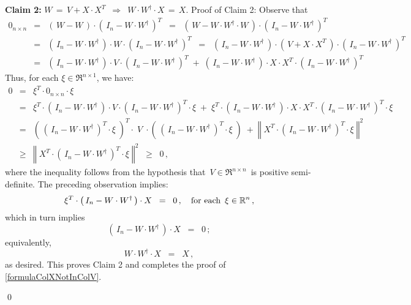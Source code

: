 \begin{enumerate}
	\vskip 0.5cm
	\noindent
	\textbf{Claim 2:}\quad
	$W \,=\, V + X \cdot X^{T}$
	\,\;$\Longrightarrow$\,\; $W \cdot W^{\dagger} \cdot X \,=\,X$.
	\vskip 0.0cm
	\noindent
	Proof of Claim 2:\quad
	Observe that
	\begin{eqnarray*}
	0_{n \times n}
	& = &
		\left(\,W - W\,\right) \cdot \left(\,I_{n} - W \cdot W^{\dagger}\,\right)^{T}
	\;\; = \;\;
		\left(\,W - W \cdot W^{\dagger} \cdot W\,\right) \cdot \left(\,I_{n} - W \cdot W^{\dagger}\,\right)^{T}
	\\
	& = &
		\left(\,I_{n} - W \cdot W^{\dagger} \,\right) \cdot W \cdot \left(\,I_{n} - W \cdot W^{\dagger}\,\right)^{T}
	\;\; = \;\;
		\left(\,I_{n} - W \cdot W^{\dagger} \,\right)
		\cdot \left(\,V + X \cdot X^{T}\,\right)
		\cdot \left(\,I_{n} - W \cdot W^{\dagger}\,\right)^{T}
	\\
	& = &
		\left(\,I_{n} - W \cdot W^{\dagger} \,\right)
		\cdot V \cdot \left(\,I_{n} - W \cdot W^{\dagger}\,\right)^{T}
		\; + \;
		\left(\,I_{n} - W \cdot W^{\dagger} \,\right)
		\cdot X \cdot X^{T} \cdot \left(\,I_{n} - W \cdot W^{\dagger}\,\right)^{T}
	\end{eqnarray*}
	Thus, for each $\xi \in \Re^{n \times 1}$, we have:
	\begin{eqnarray*}
	0
	&=&
		\xi^{T} \cdot 0_{n \times n} \cdot \xi
	\\
	& = &
		\xi^{T}
		\cdot
		\left(\,I_{n} - W \cdot W^{\dagger} \,\right) \cdot V \cdot \left(\,I_{n} - W \cdot W^{\dagger}\,\right)^{T}
		\cdot \xi
		\; + \;
		\xi^{T}
		\cdot
		\left(\,I_{n} - W \cdot W^{\dagger} \,\right) \cdot X \cdot X^{T} \cdot \left(\,I_{n} - W \cdot W^{\dagger}\,\right)^{T}
		\cdot \xi		
	\\
	& = &
		\left(\,\left(\,I_{n} - W \cdot W^{\dagger}\,\right)^{T} \cdot \xi\;\right)^{T}
		\cdot\;
			V
		\;\cdot
			\left(\,\left(\,I_{n} - W \cdot W^{\dagger}\,\right)^{T} \cdot \xi\;\right)
		\; + \;
		\left\Vert\; X^{T} \cdot \left(\,I_{n} - W \cdot W^{\dagger}\,\right)^{T} \cdot \xi \;\right\Vert^{2}
	\\
	& \geq &
		\left\Vert\; X^{T} \cdot \left(\,I_{n} - W \cdot W^{\dagger}\,\right)^{T} \cdot \xi \;\right\Vert^{2}
		\;\; \geq \;\; 0\,,
	\end{eqnarray*}
	where the inequality follows from the hypothesis that \,$V \in \Re^{n \times n}$\, is positive semi-definite.
	The preceding observation implies:
	\begin{equation*}
	\xi^{T} \cdot \left(\,I_{n} - W \cdot W^{\dagger}\,\right) \cdot X
	\;\; = \;\; 0\,,
	\quad
	\textnormal{for each \,$\xi \in \Re^{n}$}\,,
	\end{equation*}
	which in turn implies
	\begin{equation*}
	\left(\,I_{n} - W \cdot W^{\dagger}\,\right) \cdot X \;\; = \;\; 0\,;
	\end{equation*}
	equivalently,
	\begin{equation*}
	W \cdot W^{\dagger} \cdot X \;\; = \;\; X\,,
	\end{equation*}
	as desired. This proves Claim 2 and completes the proof of \eqref{formulaColXNotInColV}.
\end{enumerate}
\qed

